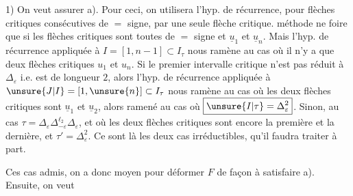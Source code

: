 
1) On veut assurer a). Pour ceci, on utilisera l'hyp. de récurrence, pour   flèches critiques consécutives de $=$ signe, par une seule flèche critique.  méthode ne foire que si les flèches critiques sont toutes de $=$ signe \inserted{$\varepsilon$} et  $\underline{u}_1$ et $\underline{u}_n$. Mais l'hyp. de récurrence appliquée à $I=[1,n-1]\subset I_\tau$ nous ramène au cas où il n'y a que deux flèches critiques $u_1$ et $u_n$. Si le premier intervalle critique n'est pas réduit à $\Delta_\varepsilon$ i.e. est de longueur $2$, alors l'hyp. de récurrence appliquée à $\unsure{J|I}=[1,\unsure{n}]\subset I_\tau$ nous ramène au cas où les deux flèches critiques sont $\underline{u}_1$ et $\underline{u}_2$,  
alors ramené au cas où $\boxed{\unsure{I|\tau}=\Delta_\varepsilon^2}$. Sinon, au cas  $\boxed{\tau=\Delta_\varepsilon\Delta_{-\varepsilon}^{\ell_2}\Delta_\varepsilon}$,  et où  les deux flèches critiques sont encore la première et la dernière, et $\tau'=\Delta_\varepsilon^2$. Ce sont là les deux cas irréductibles, qu'il  faudra traiter  à part.

 Ces cas admis, on a donc moyen pour déformer $F$ de façon à satisfaire a).  Ensuite, on veut


